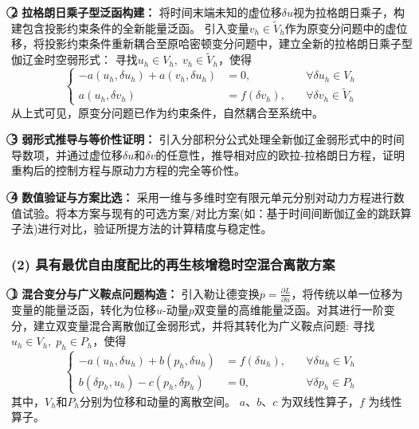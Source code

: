 \textbf{\textcircled{\small 2} 拉格朗日乘子型泛函构建：} 
将时间末端未知的虚位移$\delta u$视为拉格朗日乘子，构建包含投影约束条件的全新能量泛函。
引入变量$v_h \in \tilde V_h$作为原变分问题中的虚位移，将投影约束条件重新耦合至原哈密顿变分问题中，建立全新的拉格朗日乘子型伽辽金时空弱形式：
寻找$u_h \in V_h,\; v_h \in \tilde V_h$，使得 
\begin{equation}
    \left \{
        \begin{aligned}
        -a(u_h, \delta u_h) + a(v_h, \delta u_h) &= 0,\quad &\forall \delta u_h \in V_h \\
        a(u_h, \delta v_h) &= f(\delta v_h),\quad &\forall \delta v_h \in \tilde V_h
    \end{aligned} \right .
\end{equation}
从上式可见，原变分问题已作为约束条件，自然耦合至系统中。

\textbf{\textcircled{\small 3} 弱形式推导与等价性证明：} 引入分部积分公式处理全新伽辽金弱形式中的时间导数项，并通过虚位移$\delta u$和$\delta v$的任意性，推导相对应的欧拉-拉格朗日方程，证明重构后的控制方程与原动力方程的完全等价性。

\textbf{\textcircled{\small 4} 数值验证与方案比选：} 采用一维与多维时空有限元单元分别对动力方程进行数值试验。将本方案与现有的可选方案/对比方案(如：基于时间间断伽辽金的跳跃算子法)进行对比，验证所提方法的计算精度与稳定性。

\subsubsection*{\bfseries (2) 具有最优自由度配比的再生核增稳时空混合离散方案}

\textbf{\textcircled{\small 1} 混合变分与广义鞍点问题构造：} 引入勒让德变换$p=\frac{\partial L}{\partial \dot{u}}$，将传统以单一位移为变量的能量泛函，转化为位移$u$-动量$p$双变量的高维能量泛函。对其进行一阶变分，建立双变量混合离散伽辽金弱形式，并将其转化为广义鞍点问题:
寻找$u_h \in V_h,\; p_h \in P_h$，使得
\begin{equation}\label{eq: saddle_point}
    \left \{
        \begin{aligned}
        -a(u_h, \delta u_h) + b(p_h, \delta u_h) &= f(\delta u_h),\quad &\forall \delta u_h \in V_h \\
        b(\delta p_h, u_h) - c(p_h, \delta p_h) &= 0,\quad &\forall \delta p_h \in P_h
    \end{aligned} \right .
\end{equation}
其中，$V_h$和$P_h$分别为位移和动量的离散空间。
$a$、$b$、$c$ 为双线性算子，$f$ 为线性算子。

